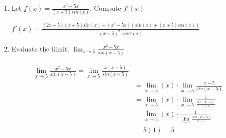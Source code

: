 \documentclass[nooutcomes]{ximera}
\begin{document}

\begin{problem} \hfil

\begin{enumerate}
	\item Let $f(x)= \frac{x^2-5x}{(x+5)sin(x)}$.  Compute $f'(x)$

	\begin{freeResponse}	
	$f'(x)= \frac{(2x-5)(x+5)sin(x)-(x^2-5x)(sin(x)+(x+5)cos(x))}{(x+5)^2 \cdot sin^2(x)}$

	\end{freeResponse}

	\item Evaluate the liimit. $\lim_{x \to 5} \frac{x^2-5x}{sin(x-5)}$

	\begin{freeResponse}
	\begin{align*}
	\lim_{x \to 5} \frac{x^2-5x}{sin(x-5)}=\lim_{x \to 5} \frac{x(x-5)}{sin(x-5)}\\
	&=\lim_{x \to 5}(x) \cdot  \lim_{x \to 5}\frac{x-5}{sin(x-5)}\\
	&=\lim_{x \to 5}(x) \cdot  \lim_{x \to 5}\frac{1}{\frac{sin(x-5)}{x-5}}\\
	&=\lim_{x \to 5}(x) \cdot  \frac{1}{\lim_{x \to 5}\frac{sin(x-5)}{x-5}}\\
	&= 5(1)=5
	\end{align*}
	\end{freeResponse}

\end{enumerate}
\end{problem}		
				
	
\end{document}
